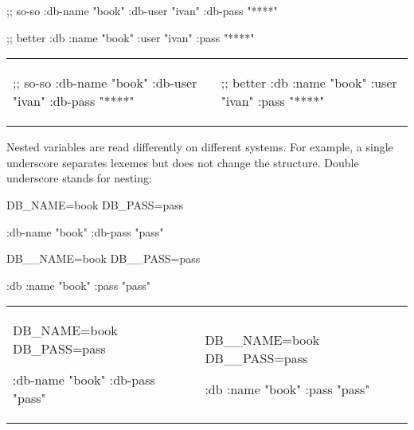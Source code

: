 
\ifx\DEVICETYPE\MOBILE

\begin{clojure}
;; so-so
{:db-name "book"
 :db-user "ivan"
 :db-pass "****"}
\end{clojure}

\splitter

\begin{clojure}
;; better
{:db {:name "book"
      :user "ivan"
      :pass "****"}}
\end{clojure}

\else


\noindent
\begin{tabular}{ @{}p{5cm} @{}p{5cm} }

\begin{clojure}
;; so-so
{:db-name "book"
 :db-user "ivan"
 :db-pass "****"}
\end{clojure}

&

\begin{clojure}
;; better
{:db {:name "book"
      :user "ivan"
      :pass "****"}}
\end{clojure}

\end{tabular}


\fi

Nested variables are read differently on different systems. For example, a single underscore separates lexemes but does not change the structure. Double underscore stands for nesting:

\ifx\DEVICETYPE\MOBILE

\begin{clojure}
DB_NAME=book
DB_PASS=pass

{:db-name "book"
 :db-pass "pass"}
\end{clojure}

\splitter

\begin{clojure}
DB__NAME=book
DB__PASS=pass

{:db {:name "book"
      :pass "pass"}}
\end{clojure}

\else


\noindent
\begin{tabular}{ @{}p{5cm} @{}p{5cm} }

\begin{clojure}
DB_NAME=book
DB_PASS=pass

{:db-name "book"
 :db-pass "pass"}
\end{clojure}

&

\begin{clojure}
DB__NAME=book
DB__PASS=pass

{:db {:name "book"
      :pass "pass"}}
\end{clojure}

\end{tabular}


